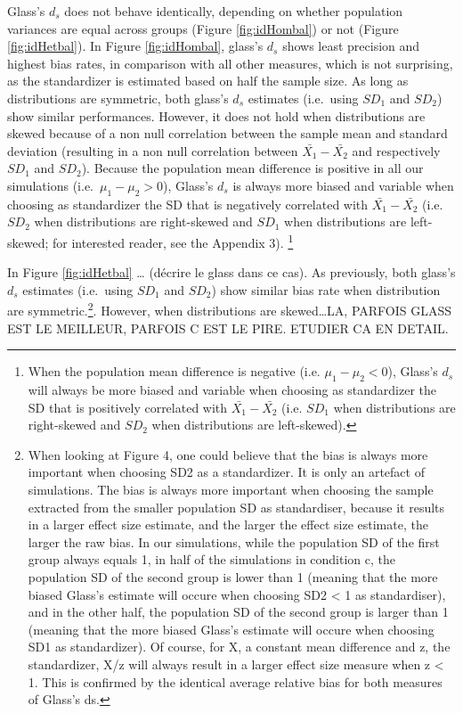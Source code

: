 \documentclass[
  man,floatsintext]{apa6}
\begin{document}
Glass's \(d_s\) does not behave identically, depending on whether population variances are equal across groups (Figure \ref{fig:idHombal}) or not (Figure \ref{fig:idHetbal}). In Figure \ref{fig:idHombal}, glass's \(d_s\) shows least precision and highest bias rates, in comparison with all other measures, which is not surprising, as the standardizer is estimated based on half the sample size. As long as distributions are symmetric, both glass's \(d_s\) estimates (i.e.~using \(SD_1\) and \(SD_2\)) show similar performances. However, it does not hold when distributions are skewed because of a non null correlation between the sample mean and standard deviation (resulting in a non null correlation between \(\bar{X_1}-\bar{X_2}\) and respectively \(SD_1\) and \(SD_2\)). Because the population mean difference is positive in all our simulations (i.e.~\(\mu_1-\mu_2>0\)), Glass's \(d_s\) is always more biased and variable when choosing as standardizer the SD that is negatively correlated with \(\bar{X_1}-\bar{X_2}\) (i.e.~\(SD_2\) when distributions are right-skewed and \(SD_1\) when distributions are left-skewed; for interested reader, see the Appendix 3). \footnote{When the population mean difference is negative (i.e. $\mu_1-\mu_2<0$), Glass's $d_s$ will always be more biased and variable when choosing as standardizer the SD that is positively correlated with $\bar{X_1}-\bar{X_2}$ (i.e. $SD_1$ when distributions are right-skewed and $SD_2$ when distributions are left-skewed).}

In Figure \ref{fig:idHetbal} \ldots{} (décrire le glass dans ce cas). As previously, both glass's \(d_s\) estimates (i.e.~using \(SD_1\) and \(SD_2\)) show similar bias rate when distribution are symmetric.\footnote{When looking at Figure 4, one could believe that the bias is always more important when choosing SD2 as a standardizer. It is only an artefact of simulations. The bias is always more important when choosing the sample extracted from the smaller population SD as standardiser, because it results in a larger effect size estimate, and the larger the effect size estimate, the larger the raw bias. In our simulations, while the population SD of the first group always equals 1, in half of the simulations in condition c, the population SD of the second group is lower than 1 (meaning that the more biased Glass's estimate will occure when choosing SD2 < 1 as standardiser), and in the other half, the population SD of the second group is larger than 1 (meaning that the more biased Glass's estimate will occure when choosing SD1 as standardizer). Of course, for X, a constant mean difference and z, the standardizer, X/z will always result in a larger effect size measure when z < 1. This is confirmed by the identical average relative bias for both measures of Glass's ds.}. However, when distributions are skewed\ldots LA, PARFOIS GLASS EST LE MEILLEUR, PARFOIS C EST LE PIRE. ETUDIER CA EN DETAIL.
\end{document}
